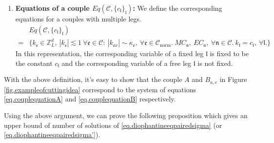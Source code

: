 \begin{defn}
\begin{enumerate}
    
    \item \textbf{Equations of a couple $Eq(\mathcal{C},\{c_{\mathfrak{l}}\}_{\mathfrak{l}})$:} We define the corresponding equations for a couples with multiple legs.
    \begin{equation}\label{eq.Eq(C,c)}
    \begin{split}
        &Eq(\mathcal{C},\{c_{\mathfrak{l}}\}_{\mathfrak{l}})
        \\
        =&\{k_{\mathfrak{e}}\in \mathbb{Z}^d_L,\ |k_{\mathfrak{e}}|\lesssim 1\ \forall \mathfrak{e}\in \mathcal{C}:\  |k_{\mathfrak{e}x}| \sim \kappa_{\mathfrak{e}},\ \forall \mathfrak{e}\in \mathcal{C}_{\text{norm}}.\ MC_{\mathfrak{n}},\  EC_{\mathfrak{n}},\ \forall \mathfrak{n}\in \mathcal{C}.\ k_{\mathfrak{l}}=c_{\mathfrak{l}},\ \forall \mathfrak{l}.\}   
    \end{split}
    \end{equation}
    In this representation, the corresponding variable of a fixed leg $\mathfrak{l}$ is fixed to be the constant $c_{\mathfrak{l}}$ and the corresponding variable of a free leg $\mathfrak{l}$ is not fixed.
\end{enumerate}
\end{defn}

With the above definition, it's easy to show that the couple $A$ and $B_{a,e}$ in Figure \ref{fig.exampleofcuttingidea} correspond to the system of equations \eqref{eq.couplequationA} and \eqref{eq.couplequationB} respectively.


Using the above argument, we can prove the following proposition which gives an upper bound of number of solutions of \eqref{eq.diophantineeqpairedsigma} (or \eqref{eq.diophantineeqpairedsigma'}).

